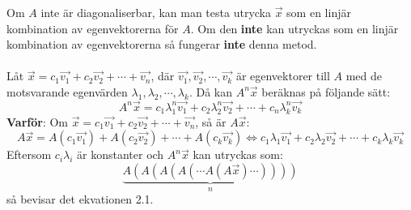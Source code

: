 \documentclass{report}
\begin{document}
{
	Om $A$ inte är diagonaliserbar, kan man testa utrycka $\vec{x}$ som en linjär kombination av egenvektorerna för $A$. Om den \textbf{inte} kan utryckas som en linjär kombination av egenvektorerna så fungerar \textbf{inte} denna metod.\\\\
	Låt $\vec{x} = c_1\vec{v_1}+c_2\vec{v_2}+\cdots+\vec{v_n}$, där $\vec{v_1}, \vec{v_2}, \cdots, \vec{v_k}$ är egenvektorer till $A$ med de motsvarande egenvärden $\lambda_1, \lambda_2, \cdots, \lambda_k$. Då kan $A^n\vec{x}$ beräknas på följande sätt:
\begin{equation}
	A^n\vec{x} = c_1 \lambda_1^n \vec{v_1} + c_2 \lambda_2^n \vec{v_2} + \cdots + c_n \lambda_k^n \vec{v_k}
\end{equation}
	\textbf{Varför}: Om $\vec{x} = c_1\vec{v_1}+c_2\vec{v_2}+\cdots+\vec{v_n}$, så är $A\vec{x}$:
\begin{equation*}
	A\vec{x} = A(c_1\vec{v_1})+A(c_2\vec{v_2})+\cdots+A(c_k\vec{v_k}) \iff c_1\lambda_1\vec{v_1}+c_2\lambda_2\vec{v_2}+\cdots+c_k\lambda_k\vec{v_k}
\end{equation*}
	Eftersom $c_i\lambda_i$ är konstanter och $A^n\vec{x}$ kan utryckas som:
\begin{equation*}
	\underbrace{A(A(A(A(\cdots A(A\vec{x})\cdots))))}_{n}
\end{equation*}
	så bevisar det ekvationen 2.1.
}

\pagebreak
\end{document}
